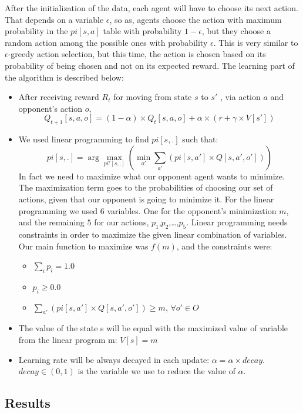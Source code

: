 \documentclass[a4paper,11pt]{article}
\begin{document}
After the initialization of the data, each agent will have to choose its next action. That depends on a variable $\epsilon$, so as, agents choose the action with maximum probability in the $pi[s,a]$ table with probability $1-\epsilon$, but they choose a random action among the possible ones with probability $\epsilon$. This is very similar to $\epsilon$-greedy action selection, but this time, the action is chosen based on its probability of being chosen and not on its expected reward. The learning part of the algorithm is described below:

\begin{itemize}
\item After receiving reward $R_t$ for moving from state $s$ to $s'$ , via action $a$ and opponent's action $o$,
\[
Q_{t+1}[s,a,o] = (1-\alpha)\times Q_t[s,a,o] + \alpha \times (r + \gamma \times V[s'])
\]

\item We used linear programming to find $pi[s,.]$ such that:
\[
pi[s,.] = \arg\max_{pi'[s,.]} {(\min_{o'} \sum_{a'} (pi[s,a'] \times Q[s,a',o']))}
\]
In fact we need to maximize what our opponent agent wants to minimize. The maximization term goes to the probabilities of choosing our set of actions, given that our opponent is going to minimize it. For the linear programming we used $6$ variables. One for the opponent's minimization $m$, and the remaining $5$ for our actions, $p_1$,$p_2$,\ldots,$p_5$. Linear programming needs constraints in order to maximize the given linear combination of variables. Our main function to maximize was $f(m)$, and the constraints were:
\begin{itemize}
\item $ \sum_{i}{p_i} = 1.0$
\item $ p_i \geq 0.0$
\item $ \sum_{a'} (pi[s,a'] \times Q[s,a',o']) \geq m$, $\forall o' \in O$
\end{itemize}
\item The value of the state s will be equal with the maximized value of variable from the linear program m: $V[s] = m$
\item Learning rate will be always decayed in each update: $\alpha = \alpha \times decay$. $decay \in (0,1)$ is the variable we use to reduce the value of $\alpha$.
\end{itemize}
\subsection{Results}
\end{document}
